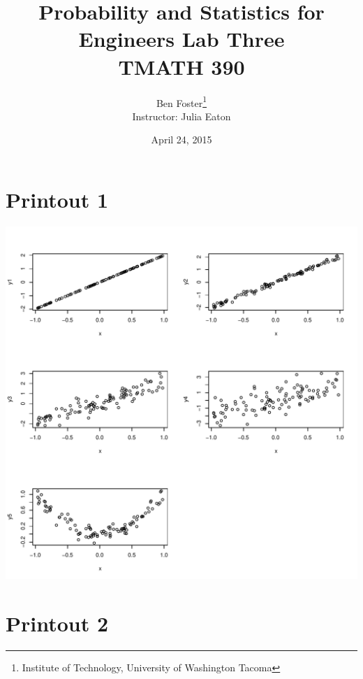 \documentclass{article}
\begin{document}
{ %
	\title{Probability and Statistics for Engineers Lab Three \\ TMATH 390}
	\author{Ben Foster\thanks{
		Institute of Technology, University of Washington Tacoma} \\
		Instructor: Julia Eaton}
	\date{April 24, 2015}
	\maketitle
	\thispagestyle{empty} %
	\clearpage
	
	\tableofcontents
	\clearpage
	\setcounter{page}{1}
}

\section*{Printout 1}

	\includegraphics[page=1]{img/Lab3_1.pdf} 

\section*{Printout 2}
\end{document}
